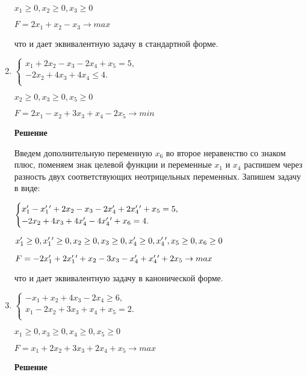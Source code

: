 \documentclass[12pt]{article}
\begin{document}
\begin{enumerate}
\begin{center}
$x_1\ge0, x_2\ge0, x_3\ge0$

$F=2x_1+x_2 -x_3 \rightarrow max$
\end{center}
что и дает эквивалентную задачу в стандартной форме.
\newpage
\item

\begin{center}
$\begin{cases}
  x_1 +2x_2-x_3-2x_4 + x_5 = 5,\\ 
  -2x_2 +4x_3 + 4x_4 \le4.\\
\end{cases}$

$x_2\ge0, x_3\ge0, x_5\ge0$

$F=2x_1-x_2+ 3x_3 + x_4-2x_5\rightarrow min$
\end{center}

\textbf{Решение}

Введем дополнительную переменную $x_6$ во второе неравенство со знаком плюс, поменяем знак целевой функции и переменные $x_1$ и $x_4$ распишем через разность двух соответствующих неотрицельных переменных. Запишем задачу в виде:
\begin{center}
$\begin{cases}
  x_1\rq{} - x_1\rq{} \rq{} +2x_2-x_3-2x_4\rq{} + 2x_4\rq{} \rq{} + x_5 = 5,\\ 
  -2x_2 +4x_3 + 4x_4\rq{} - 4x_4\rq{}\rq{}  + x_6=4.\\
\end{cases}$

$x_1\rq{}\ge0,x_1\rq{}\rq{}\ge0,x_2\ge0, x_3\ge0,x_4\rq{}\ge0,x_4\rq{}\rq{}, x_5\ge0, x_6\ge0$

$F=-2x_1\rq{} + 2x_1\rq{} \rq{}+x_2- 3x_3 - x_4\rq{} +x_4\rq{}\rq{}+2x_5\rightarrow max$
\end{center}
что и дает эквивалентную задачу в канонической форме.


\item

\begin{center}
$\begin{cases}
  -x_1 +x_2+4x_3-2x_4\ge 6,\\ 
  x_1-2x_2+ 3x_3 + x_4+x_5 =2.\\
\end{cases}$

$x_1\ge0, x_3\ge0, x_4\ge0, x_5\ge0$

$F=x_1+2x_2+ 3x_3 + 2x_4+x_5\rightarrow max$
\end{center}

\textbf{Решение}


\end{enumerate}
\end{document}

